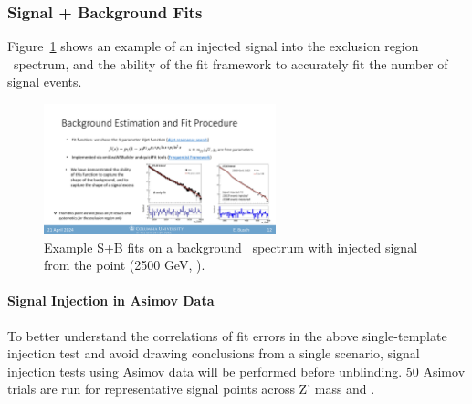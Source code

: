 \subsubsection{Signal + Background Fits}
\label{subsec:fit_splusb}

Figure~\ref{fig:splusb_sigInj} shows an example of an injected signal into the exclusion region \mt~spectrum, and the ability of the fit framework to accurately fit the number of signal events.
\begin{figure}[!htbp]
\centering
   \includegraphics[width=0.6\textwidth]{figures/stats/splusb_sigInj}
    \caption{Example S+B fits on a background \mt~spectrum with injected signal from the point (2500 GeV, ).
    \label{fig:splusb_sigInj}}
\end{figure}

\paragraph{Signal Injection in Asimov Data}
To better understand the correlations of fit errors in the above single-template injection test and avoid drawing conclusions from a single scenario, signal injection tests using Asimov data will be performed before unblinding. 
50 Asimov trials are run for representative signal points across Z' mass and \rinv.


